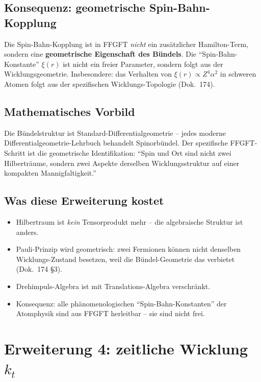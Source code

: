 \subsection{Konsequenz: geometrische Spin-Bahn-Kopplung}

Die Spin-Bahn-Kopplung ist in FFGFT \emph{nicht} ein zusätzlicher
Hamilton-Term, sondern eine \textbf{geometrische Eigenschaft des
Bündels}. Die \enquote{Spin-Bahn-Konstante} $\xi(r)$ ist nicht
ein freier Parameter, sondern folgt aus der Wicklungsgeometrie.
Insbesondere: das Verhalten von $\xi(r) \propto Z^4 \alpha^2$ in
schweren Atomen folgt aus der spezifischen Wicklungs-Topologie
(Dok.~174).

\subsection{Mathematisches Vorbild}

Die Bündelstruktur ist Standard-Differentialgeometrie -- jedes
moderne Differentialgeometrie-Lehrbuch behandelt Spinorbündel.
Der spezifische FFGFT-Schritt ist die geometrische Identifikation:
\enquote{Spin und Ort sind nicht zwei Hilberträume, sondern zwei
Aspekte derselben Wicklungsstruktur auf einer kompakten
Mannigfaltigkeit.}

\subsection{Was diese Erweiterung kostet}

\begin{itemize}[leftmargin=2em,itemsep=2pt,topsep=2pt]
  \item Hilbertraum ist \emph{kein} Tensorprodukt mehr -- die
        algebraische Struktur ist anders.
  \item Pauli-Prinzip wird geometrisch: zwei Fermionen können nicht
        denselben Wicklungs-Zustand besetzen, weil die
        Bündel-Geometrie das verbietet (Dok.~174 §3).
  \item Drehimpuls-Algebra ist mit Translations-Algebra verschränkt.
  \item Konsequenz: alle phänomenologischen
        \enquote{Spin-Bahn-Konstanten} der Atomphysik sind aus
        FFGFT herleitbar -- sie sind nicht frei.
\end{itemize}

\section{\texorpdfstring{Erweiterung 4: zeitliche Wicklung $k_t$}{Erweiterung 4: zeitliche Wicklung k_t}}

